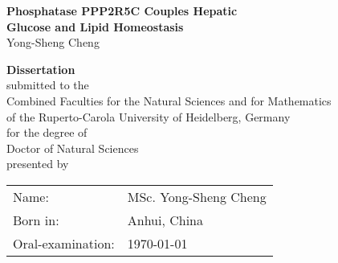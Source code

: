 \documentclass[
     12pt,         %
     a4paper,      %
     BCOR10mm,     %
     DIV14,        %
     listof=totoc,   %
     bibliography=totoc,     %
     index=totoc,     %
     ]{scrreprt}   %
\newcommand{\blankpage}{
\newpage
\thispagestyle{empty}
\mbox{}
\addtocounter{page}{-1}%
\newpage
}
\begin{document}
 
\begin{titlepage}

\thispagestyle{empty}

\vspace*{5cm} %

\begin{center}

\begin{minipage}{0.8\textwidth}\centering

{\large \textbf{Phosphatase PPP2R5C Couples Hepatic\\
\vspace{0.5cm}
Glucose and Lipid Homeostasis}\\
\vspace{2cm}
Yong-Sheng Cheng
}
\end{minipage}

\end{center}

\blankpage
\thispagestyle{empty}

\vspace*{1cm}
\begin{center}
\vspace*{3cm} 
\textbf{\Large{Dissertation}}\\
\vspace*{1cm}
\large{
submitted to the\\
Combined Faculties for the Natural Sciences and for Mathematics\\
of the Ruperto-Carola University of Heidelberg, Germany\\
for the degree of\\
Doctor of Natural Sciences\\


\vfill 
presented by\\
}

\vspace*{1cm}

{\large
\begin{tabular}[l]{ll}
Name: & MSc. Yong-Sheng Cheng\\
Born in: & Anhui, China\\
Oral-examination: & \today
\end{tabular}
}

\end{center}
\blankpage
\thispagestyle{empty}

\vspace*{5cm}


\end{titlepage}
\end{document}
